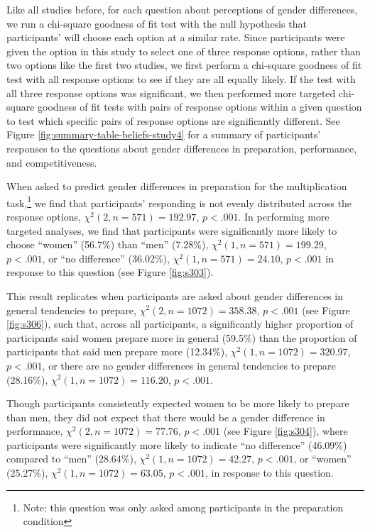 \documentclass[a4paper, nobind]{templates/ociamthesis}
\begin{document}
Like all studies before, for each question about perceptions of gender differences, we run a chi-square goodness of fit test with the null hypothesis that participants' will choose each option at a similar rate. Since participants were given the option in this study to select one of three response options, rather than two options like the first two studies, we first perform a chi-square goodness of fit test with all response options to see if they are all equally likely. If the test with all three response options was significant, we then performed more targeted chi-square goodness of fit tests with pairs of response options within a given question to test which specific pairs of response options are significantly different. See Figure \ref{fig:summary-table-beliefs-study4} for a summary of participants' responses to the questions about gender differences in preparation, performance, and competitiveness.

When asked to predict gender differences in preparation for the multiplication task,\footnote{Note: this question was only asked among participants in the preparation condition} we find that participants' responding is not evenly distributed across the response options, \(\chi^2(2, n = 571) = 192.97\), \(p < .001\). In performing more targeted analyses, we find that participants were significantly more likely to choose ``women'' (56.7\%) than ``men'' (7.28\%), \(\chi^2(1, n = 571) = 199.29\), \(p < .001\), or ``no difference'' (36.02\%), \(\chi^2(1, n = 571) = 24.10\), \(p < .001\) in response to this question (see Figure \ref{fig:s303}).

This result replicates when participants are asked about gender differences in general tendencies to prepare, \(\chi^2(2, n = 1072) = 358.38\), \(p < .001\) (see Figure \ref{fig:s306}), such that, across all participants, a significantly higher proportion of participants said women prepare more in general (59.5\%) than the proportion of participants that said men prepare more (12.34\%), \(\chi^2(1, n = 1072) = 320.97\), \(p < .001\), or there are no gender differences in general tendencies to prepare (28.16\%), \(\chi^2(1, n = 1072) = 116.20\), \(p < .001\).

Though participants consistently expected women to be more likely to prepare than men, they did not expect that there would be a gender difference in performance, \(\chi^2(2, n = 1072) = 77.76\), \(p < .001\) (see Figure \ref{fig:s304}), where participants were significantly more likely to indicate ``no difference'' (46.09\%) compared to ``men'' (28.64\%), \(\chi^2(1, n = 1072) = 42.27\), \(p < .001\), or ``women'' (25.27\%), \(\chi^2(1, n = 1072) = 63.05\), \(p < .001\), in response to this question.
\end{document}
